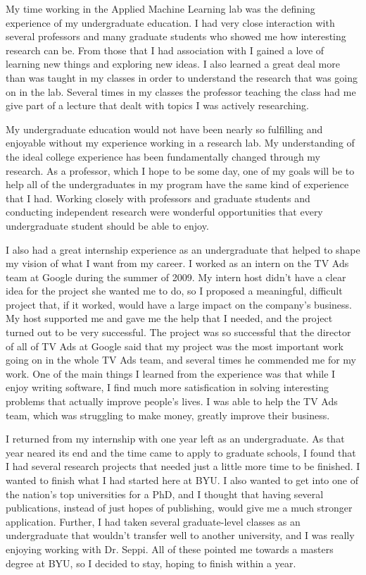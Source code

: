 \documentclass[onecolumn, 12pt]{article}
\begin{document}
My time working in the Applied Machine Learning lab was the defining experience
of my undergraduate education.  I had very close interaction with several
professors and many graduate students who showed me how interesting research
can be.  From those that I had association with I gained a love of learning new
things and exploring new ideas.  I also learned a great deal more than was
taught in my classes in order to understand the research that was going on in
the lab.  Several times in my classes the professor teaching the class had me
give part of a lecture that dealt with topics I was actively researching.  

My undergraduate education would not have been nearly so fulfilling and
enjoyable without my experience working in a research lab.  My understanding of
the ideal college experience has been fundamentally changed through my
research.  As a professor, which I hope to be some day, one of my goals will be
to help all of the undergraduates in my program have the same kind of
experience that I had.  Working closely with professors and graduate students
and conducting independent research were wonderful opportunities that every
undergraduate student should be able to enjoy.

I also had a great internship experience as an undergraduate that helped to
shape my vision of what I want from my career.  I worked as an intern on the TV
Ads team at Google during the summer of 2009.  My intern host didn't have a
clear idea for the project she wanted me to do, so I proposed a meaningful,
difficult project that, if it worked, would have a large impact on the
company's business.  My host supported me and gave me the help that I needed,
and the project turned out to be very successful.  The project was so
successful that the director of all of TV Ads at Google said that my project
was the most important work going on in the whole TV Ads team, and several
times he commended me for my work.  One of the main things I learned from the
experience was that while I enjoy writing software, I find much more
satisfication in solving interesting problems that actually improve people's
lives.  I was able to help the TV Ads team, which was struggling to make money,
greatly improve their business.

I returned from my internship with one year left as an undergraduate.  As that
year neared its end and the time came to apply to graduate schools, I found
that I had several research projects that needed just a little more time to be
finished.  I wanted to finish what I had started here at BYU.  I also wanted to
get into one of the nation's top universities for a PhD, and I thought that
having several publications, instead of just hopes of publishing, would give me
a much stronger application.  Further, I had taken several graduate-level
classes as an undergraduate that wouldn't transfer well to another university,
and I was really enjoying working with Dr. Seppi.  All of these pointed me
towards a masters degree at BYU, so I decided to stay, hoping to finish within
a year.
\end{document}
